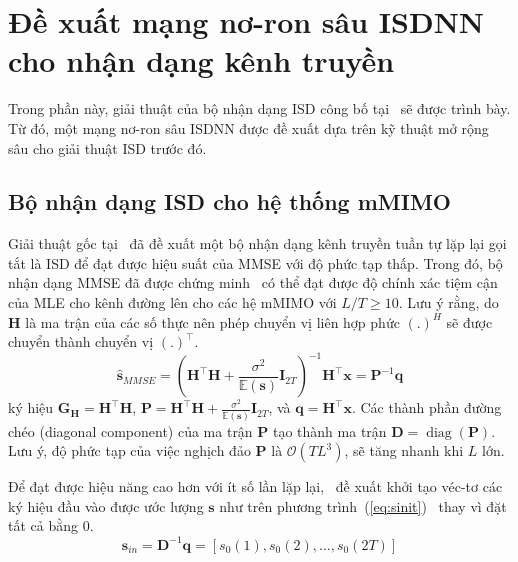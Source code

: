 \section{Đề xuất mạng nơ-ron sâu ISDNN cho nhận dạng kênh truyền}

Trong phần này, giải thuật của bộ nhận dạng ISD công bố tại~\cite{Mandloi2017} sẽ được trình bày. Từ đó, một mạng nơ-ron sâu ISDNN được đề xuất dựa trên kỹ thuật mở rộng sâu cho giải thuật ISD trước đó.

\subsection{Bộ nhận dạng ISD cho hệ thống mMIMO}

Giải thuật gốc tại~\cite{Mandloi2017} đã đề xuất một bộ nhận dạng kênh truyền tuần tự lặp lại gọi tắt là ISD để đạt được hiệu suất của MMSE với độ phức tạp thấp. Trong đó, bộ nhận dạng MMSE đã được chứng minh~\cite{Rusek2013} có thể đạt được độ chính xác tiệm cận của MLE cho kênh đường lên cho các hệ mMIMO với $L/T \ge 10$. Lưu ý rằng, do $\mathbf{H}$ là ma trận của các số thực nên phép chuyển vị liên hợp phức $(.)^H$ sẽ được chuyển thành chuyển vị $(.)^\top$.
\begin{equation}
    \hat{\mathbf{s}}_{MMSE}=\left(\mathbf{H}^\top \mathbf{H}+\frac{\sigma^2}{\mathbb{E}(\mathbf{s})} \mathbf{I}_{2T}\right)^{-1} \mathbf{H}^\top \mathbf{x}=\mathbf{P}^{-1} \mathbf{q}
\end{equation}
ký hiệu $\mathbf{G}_\mathbf{H} = \mathbf{H}^\top \mathbf{H}$, $\mathbf{P} = \mathbf{H}^\top \mathbf{H}+\frac{\sigma^2}{\mathbb{E}(\mathbf{s})} \mathbf{I}_{2T}$, và $\mathbf{q} = \mathbf{H}^\top \mathbf{x}$. 
Các thành phần đường chéo (diagonal component) của ma trận $\mathbf{P}$ tạo thành ma trận $\mathbf{D} = \operatorname{diag}(\mathbf{P})$.
Lưu ý, độ phức tạp của việc nghịch đảo $\mathbf{P}$ là $\mathcal{O}(TL^3)$, sẽ tăng nhanh khi $L$ lớn. 

Để đạt được hiệu năng cao hơn với ít số lần lặp lại,~\cite{Mandloi2017} đề xuất khởi tạo véc-tơ các ký hiệu đầu vào được ước lượng $\mathbf{s}$ như trên phương trình~(\ref{eq:sinit})~\cite{Gao2014} thay vì đặt tất cả bằng $0$.
\begin{equation}
\label{eq:sinit}
    \mathbf{s}_{in}=\mathbf{D}^{-1} \mathbf{q}=\left[s_0(1), s_0(2), \ldots, s_0(2T)\right]
\end{equation}

